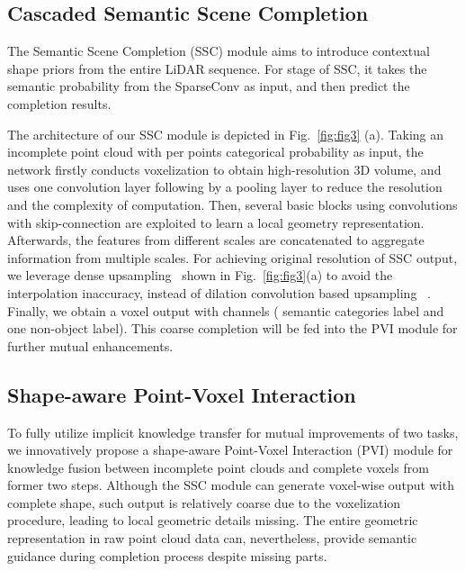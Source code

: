\documentclass[letterpaper]{article} \usepackage{aaai21}  \usepackage{times}  \usepackage{helvet} \usepackage{courier}  \usepackage[hyphens]{url}  \usepackage{graphicx} \urlstyle{rm} \def\UrlFont{\rm}  \usepackage{natbib}  \usepackage{booktabs}
\begin{document}
	\subsection{Cascaded Semantic Scene Completion}
	\label{completion}
    The Semantic Scene Completion (SSC) module aims to introduce contextual shape priors from the entire LiDAR sequence. For stage of SSC, it takes the semantic probability  from the SparseConv as input, and then predict the completion results.
	
	The architecture of our SSC module is depicted in Fig.~\ref{fig:fig3} (a). 
Taking an incomplete point cloud with per points categorical probability as input, the network firstly conducts voxelization to obtain high-resolution 3D volume, and uses one convolution layer following by a pooling layer to reduce the resolution and the complexity of computation. 
Then, several basic blocks using convolutions with skip-connection are exploited to learn a local geometry representation. 
Afterwards, the features from different scales are concatenated to aggregate information from multiple scales. 
For achieving original resolution of SSC output, we leverage dense upsampling~\cite{liu2018see} shown in Fig.~\ref{fig:fig3}(a) to avoid the interpolation inaccuracy, instead of dilation convolution based 
	upsampling ~\cite{Song2017Semantic}.
Finally, we obtain a voxel output with  channels ( semantic categories label and one non-object label).
This coarse completion will be fed into the PVI module for further mutual enhancements.
	
	
	\subsection{Shape-aware Point-Voxel Interaction}
	
	\label{interaction}
	To fully utilize implicit knowledge transfer for mutual improvements of two tasks, we innovatively propose a shape-aware Point-Voxel Interaction (PVI) module for knowledge fusion between incomplete point clouds and complete voxels from former two steps. 
Although the SSC module can generate voxel-wise output with complete shape, such output is relatively coarse due to the voxelization procedure, leading to local geometric details missing. 
The entire geometric representation in raw point cloud data can, nevertheless, provide semantic guidance during completion process despite missing parts. 
	
\end{document}
